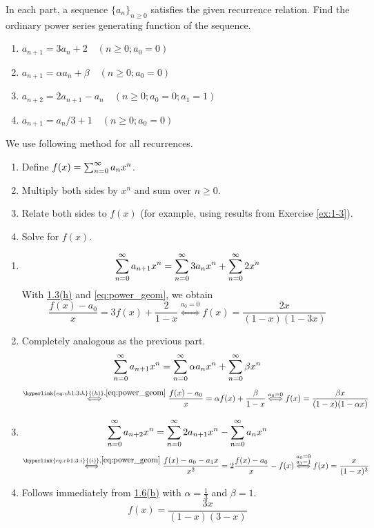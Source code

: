 \begin{exercise}
    \label{ex:1-6}
    In each part, a sequence $\{a_n\}_{n\geq 0}$ satisfies the given recurrence relation. Find the ordinary power series generating function of the sequence.
    \begin{enumerate}[label=(\alph*)]
        \item $a_{n+1} = 3a_n + 2 \quad (n\geq 0;a_0=0)$
        \item $a_{n+1} = \alpha a_n + \beta \quad (n\geq 0;a_0=0)$
        \item $a_{n+2} = 2a_{n+1} - a_n \quad (n\geq 0; a_0=0; a_1=1)$
        \item $a_{n+1} = a_n / 3 +1 \quad (n \geq 0; a_0 = 0)$
    \end{enumerate}
\end{exercise}
\begin{solution}
    We use following method for all recurrences.
        \begin{enumerate}
            \item Define $f(x) = \sum_{n=0}^\infty a_n x^n$.
            \item Multiply both sides by $x^n$ and sum over $n \geq 0$.
            \item Relate both sides to $f(x)$ (for example, using results from Exercise \ref{ex:1-3}).
            \item Solve for $f(x)$.
        \end{enumerate}
    \begin{enumerate}[label=(\alph*)]
        \item \[
            \sum_{n=0}^\infty a_{n+1} x^n = \sum_{n=0}^\infty 3a_n x^n + \sum_{n=0}^\infty 2x^n
        \]
        With \hyperlink{eq:ch1:3:h}{1.3(h)} and \eqref{eq:power_geom}, we obtain
        \[
            \frac{f(x) - a_0}{x} = 3f(x) + \frac{2}{1-x} \overset{a_0=0}{\Longleftrightarrow}f(x) = \frac{2x}{(1-x)(1-3x)}
        \]
        \item \hypertarget{eq:ch1:6:b}{} Completely analogous as the previous part.
        \[
            \sum_{n=0}^\infty a_{n+1} x^n = \sum_{n=0}^\infty \alpha a_n x^n + \sum_{n=0}^\infty \beta x^n
        \]
        \[
            \overset{\hyperlink{eq:ch1:3:h}{(h)},\eqref{eq:power_geom}}{\Longleftrightarrow} \frac{f(x) - a_0}{x} = \alpha f(x) + \frac{\beta}{1-x} \overset{a_0=0}{\Longleftrightarrow}  f(x) = \frac{\beta x}{(1-x)(1-\alpha x)}
        \]
        \item 
        \[
            \sum_{n=0}^\infty a_{n+2}x^n = \sum_{n=0}^\infty 2a_{n+1}x^n - \sum_{n=0}^\infty a_n x^n
        \]
        \[
            \overset{\hyperlink{eq:ch1:3:i}{(i)},\eqref{eq:power_geom}}{\Longleftrightarrow} \frac{f(x) - a_0 - a_1x}{x^2} = 2\frac{f(x) - a_0}{x} - f(x) \stackrel{\substack{a_0=0\\a_1=1}}{\Longleftrightarrow} f(x) = \frac{x}{(1-x)^2}
        \]
        \item Follows immediately from \hyperlink{eq:ch1:6:b}{1.6(b)} with $\alpha=\frac13$ and $\beta=1$.
        \[
            f(x) = \frac{3x}{(1-x)(3-x)}
        \]
    \end{enumerate}
\end{solution}

